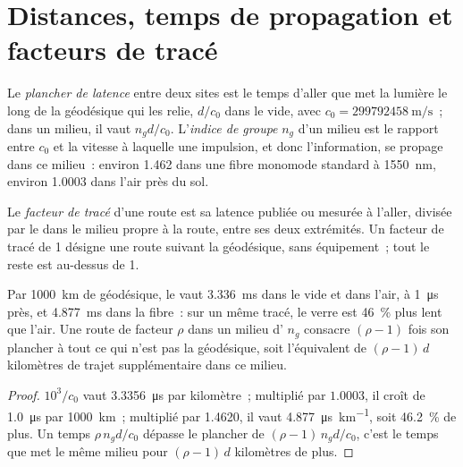 \section{Distances, temps de propagation et facteurs de tracé}

\begin{definition}\label{def:nw:the-north-american-map:floor}
Le \emph{plancher de latence} entre deux sites est le temps d'aller que met la lumière le long de la géodésique qui les relie, $d/c_0$ dans
le vide, avec $c_0 = \qty{299792458}{\metre\per\second}$~; dans un milieu, il vaut $n_g d / c_0$. L'\emph{indice de groupe} $n_g$ d'un
milieu est le rapport entre $c_0$ et la vitesse à laquelle une impulsion, et donc l'information, se propage dans ce milieu~: environ 1.462 dans une fibre monomode standard
à \qty{1550}{\nano\metre}, environ 1.0003 dans l'air près du sol.
\end{definition}

\begin{definition}\label{def:nw:the-north-american-map:factor}
Le \emph{facteur de tracé} d'une route est sa latence publiée ou mesurée à l'aller, divisée par le  dans le
milieu propre à la route, entre ses deux extrémités. Un facteur de tracé de 1 désigne une route suivant la géodésique, sans équipement~; tout le reste est au-dessus de 1.
\end{definition}

\begin{proposition}\label{prop:nw:the-north-american-map:floors}
Par \qty{1000}{\kilo\metre} de géodésique, le  vaut \qty{3.336}{\milli\second} dans le vide et dans l'air, à
\qty{1}{\micro\second} près, et \qty{4.877}{\milli\second} dans la fibre~: sur un même tracé, le verre est 46~\% plus lent que l'air.
Une route de facteur $\rho$ dans un milieu d' $n_g$ consacre $(\rho - 1)$ fois son plancher à tout ce qui n'est pas la géodésique, soit l'équivalent de
$(\rho - 1)\,d$ kilomètres de trajet supplémentaire dans ce milieu.
\end{proposition}

\begin{proof}
$10^3/c_0$ vaut \qty{3.3356}{\micro\second} par kilomètre~; multiplié par $1.0003$, il croît de \qty{1.0}{\micro\second} par \qty{1000}{\kilo\metre}~; multiplié par
1.4620, il vaut \qty{4.877}{\micro\second\per\kilo\metre}, soit 46.2~\% de plus. Un temps $\rho\, n_g d / c_0$ dépasse le plancher de $(\rho-1)\,n_g d/c_0$,
c'est le temps que met le même milieu pour $(\rho-1)\,d$ kilomètres de plus.
\end{proof}

